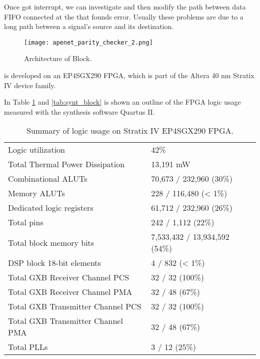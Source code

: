 Once got interrupt, we can investigate and then modify the path
between data FIFO connected at the  that
founds error. Usually these problems are due to a long path between a
signal's source and its destination.


 \begin{figure}[!hbt]
  \centering
  \texttt{[image: apenet\_parity\_checker\_2.png]}
  \caption{Architecture of  Block.}
  \label{fig:par_check_2}
\end{figure}

 \apenetp is developed on an EP4SGX290 FPGA, which is part of the
Altera 40 nm Stratix IV device family.



In Table \ref{tab:synt_summary} and \ref{tab:synt_block} is shown an
outline of the FPGA logic usage measured with the synthesis software
Quartus II.

\begin{table}[!htb]
\centering
\begin{tabular}{|l|l|}
\hline
\hline
Logic utilization                 & 42\%                          \\
Total Thermal Power Dissipation   & 13,191 mW                     \\
Combinational ALUTs               & 70,673 / 232,960 (30\%)       \\
Memory ALUTs                      & 228 / 116,480 (< 1\%)         \\
Dedicated logic registers         & 61,712 / 232,960 (26\%)       \\
Total pins                        & 242 / 1,112 (22\%)            \\
Total block memory bits           & 7,533,432 / 13,934,592 (54\%) \\
DSP block 18-bit elements         & 4 / 832 (< 1\%)               \\
Total GXB Receiver Channel PCS    & 32 / 32 (100\%)               \\
Total GXB Receiver Channel PMA    & 32 / 48 (67\%)                \\
Total GXB Transmitter Channel PCS & 32 / 32 (100\%)               \\
Total GXB Transmitter Channel PMA & 32 / 48 (67\%)                \\
Total PLLs                        & 3 / 12 (25\%)                 \\
\hline
\hline
\end{tabular}
\caption{Summary of \apenetp logic usage on Stratix IV EP4SGX290 FPGA.}
\label{tab:synt_summary}
\end{table}


